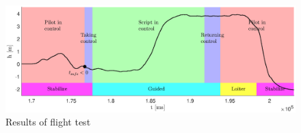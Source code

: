 
\begin{figure}[htbp]
	\centering
	\includegraphics[width=\textwidth,clip,trim={0 0.1cm 0 0.1cm }]{./figures/flight.eps}
	\caption{Results of flight test}
	\label{fig:flight}
\end{figure}
